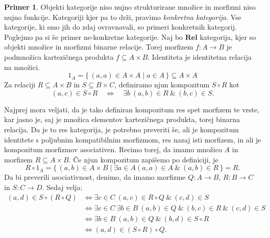 \documentclass[12pt,a4paper]{book}
\theoremstyle{definition}
\theoremstyle{plain}
\theoremstyle{definition}
\newtheorem{primer}{Primer}[section]
\theoremstyle{remark}
\newcommand{\cat}[1]{\textbf{#1}}
\renewcommand{\set}[1]{\{\,#1\,\}}
\begin{document}
\begin{primer}
Objekti kategorije niso nujno strukturirane množice in morfizmi niso nujno funkcije. Kategoriji kjer pa to drži, pravimo \emph{konkretna kategorija}. Vse kategorije, ki smo jih do zdaj ovravnavali, so primeri konkretnih kategorij.
Poglejmo pa si še primer ne-konkretne kategorije. Naj bo $\cat{Rel}$ kategorija, kjer so objekti množice in morfizmi binarne relacije. Torej morfizem $f : A \to B$ je podmnožica kartezičnega produkta $f \subseteq A \times B$. Identiteta je identitetna relacija na množici.
$$ 1_A = \set{(a,a) \in A \times A \mid a \in A} \subseteq A \times A$$
Za relaciji $R \subseteq A \times B$ in $S \subseteq B \times C$, definiramo njun kompozitum $S \circ R$ kot
$$(a,c) \in S \circ R \quad \Leftrightarrow \quad \exists b \ (a,b) \in R \ \& \ (b,c) \in S.$$

Najprej mora veljati, da je tako definiran kompozitum res spet morfizem te vrste, kar jasno je, saj je množica elementov kartezičnega produkta, torej binarna relacija. Da je to res kategorija, je potrebno preveriti še, ali je kompozitum identitete s poljubnim kompatibilnim morfizmom, res nazaj isti morfizem, in ali je kompozitum morfizmov asociativen. Recimo torej, da imamo množico $A$ in morfizem $R \subseteq A \times B$. Če njun kompozitum zapišemo po definiciji, je
$$R \circ 1_A = \set{(a,b) \in A \times B \mid \exists a \in A (a,a) \in A \ \& \ (a,b)\in R} = R.$$
Da bi preverili asociativnost, denimo, da imamo morfizme $Q:A \to B$, $R:B \to C$ in $S: C \to D$. Sedaj velja:
\begin{align*}
(a,d) \in S \circ (R \circ Q) &\Leftrightarrow \exists c \in C \ (a,c) \in R \circ Q \ \& \ (c,d) \in S \\
&\Leftrightarrow \exists c \in C \ \exists b \in B \ (a,b) \in Q \ \& \ (b,c) \in R \ \& \ (c,d) \in S \\
&\Leftrightarrow \exists b \in B \ (a,b) \in Q \ \& \ (b,d) \in S \circ R \\
&\Leftrightarrow (a,d) \in (S \circ R) \circ Q.
\end{align*}

\end{primer}
\end{document}
